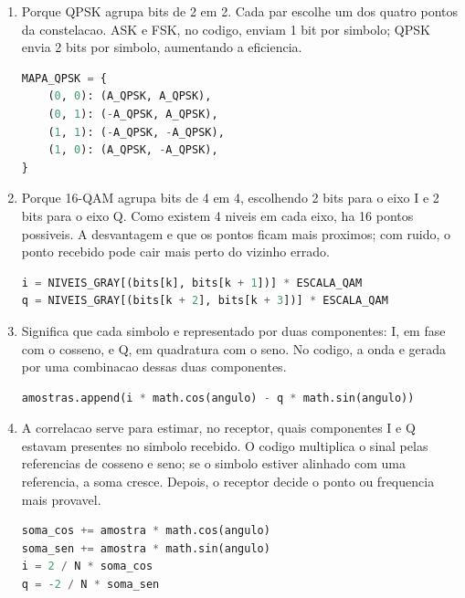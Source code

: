 \documentclass[12pt,a4paper]{article}
\begin{document}
\begin{enumerate}
  \begin{lstlisting}[language=Python]
f0, f1 = CICLOS_FSK
e0 = math.hypot(*correlacionar(simbolo, f0))
e1 = math.hypot(*correlacionar(simbolo, f1))
  \end{lstlisting}

  \item Porque QPSK agrupa bits de 2 em 2. Cada par escolhe um dos quatro pontos da constelacao. ASK e FSK, no codigo, enviam 1 bit por simbolo; QPSK envia 2 bits por simbolo, aumentando a eficiencia.

  \begin{lstlisting}[language=Python]
MAPA_QPSK = {
    (0, 0): (A_QPSK, A_QPSK),
    (0, 1): (-A_QPSK, A_QPSK),
    (1, 1): (-A_QPSK, -A_QPSK),
    (1, 0): (A_QPSK, -A_QPSK),
}
  \end{lstlisting}

  \item Porque 16-QAM agrupa bits de 4 em 4, escolhendo 2 bits para o eixo I e 2 bits para o eixo Q. Como existem 4 niveis em cada eixo, ha 16 pontos possiveis. A desvantagem e que os pontos ficam mais proximos; com ruido, o ponto recebido pode cair mais perto do vizinho errado.

  \begin{lstlisting}[language=Python]
i = NIVEIS_GRAY[(bits[k], bits[k + 1])] * ESCALA_QAM
q = NIVEIS_GRAY[(bits[k + 2], bits[k + 3])] * ESCALA_QAM
  \end{lstlisting}

  \item Significa que cada simbolo e representado por duas componentes: I, em fase com o cosseno, e Q, em quadratura com o seno. No codigo, a onda e gerada por uma combinacao dessas duas componentes.

  \begin{lstlisting}[language=Python]
amostras.append(i * math.cos(angulo) - q * math.sin(angulo))
  \end{lstlisting}

  \item A correlacao serve para estimar, no receptor, quais componentes I e Q estavam presentes no simbolo recebido. O codigo multiplica o sinal pelas referencias de cosseno e seno; se o simbolo estiver alinhado com uma referencia, a soma cresce. Depois, o receptor decide o ponto ou frequencia mais provavel.

  \begin{lstlisting}[language=Python]
soma_cos += amostra * math.cos(angulo)
soma_sen += amostra * math.sin(angulo)
i = 2 / N * soma_cos
q = -2 / N * soma_sen
  \end{lstlisting}


\end{enumerate}
\end{document}
